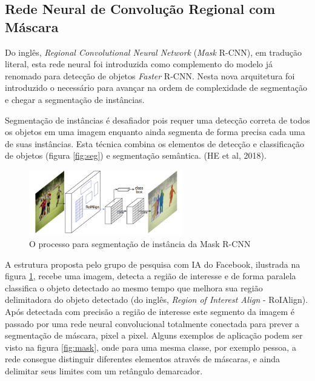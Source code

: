 \documentclass[12pt]{report}
\begin{document}
\subsection{Rede Neural de Convolução Regional com Máscara}

Do inglês, \textit{Regional Convolutional Neural Network} (\textit{Mask} R-CNN), em tradução literal, esta rede neural foi introduzida como complemento do modelo já renomado para detecção de objetos \textit{Faster} R-CNN. Nesta nova arquitetura foi introduzido o necessário para avançar na ordem de complexidade de segmentação e chegar a segmentação de instâncias. 

Segmentação de instâncias é desafiador pois requer uma detecção correta de todos os objetos em uma imagem enquanto ainda segmenta de forma precisa cada uma de suas instâncias. Esta técnica combina os elementos de detecção e classificação de objetos (figura \ref{fig:seg}) e segmentação semântica. (HE et al, 2018).

\begin{figure}
    \centering
    \includegraphics[width=0.6\textwidth]{images/futebol.png}
    \caption{O processo para segmentação de instância da Mask R-CNN}
    \label{fig:futebol}
\end{figure}

A estrutura proposta pelo grupo de pesquisa com IA do Facebook, ilustrada na figura \ref{fig:futebol}, recebe uma imagem, detecta a região de interesse e de forma paralela classifica o objeto detectado ao mesmo tempo que melhora sua região delimitadora do objeto detectado (do inglês, \textit{Region of Interest Align} - RoIAlign). Após detectada com precisão a região de interesse este segmento da imagem é passado por uma rede neural convolucional totalmente conectada para prever a segmentação de máscara, pixel a pixel. Alguns exemplos de aplicação podem ser visto na figura \ref{fig:mask}, onde para uma mesma classe, por exemplo pessoa, a rede consegue distinguir diferentes elementos através de máscaras, e ainda delimitar seus limites com um retângulo demarcador.
\end{document}
